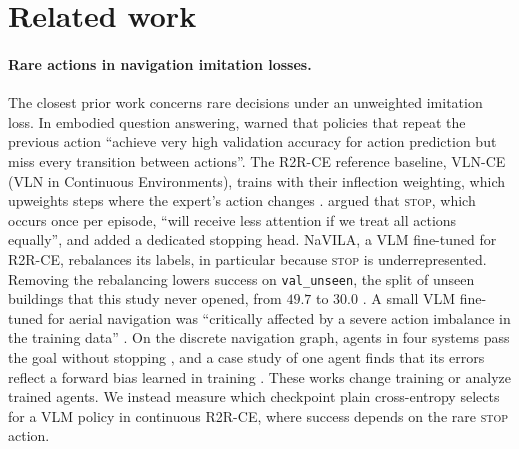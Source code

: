 \section{Related work}
\label{sec:related}

\paragraph{Rare actions in navigation imitation losses.} The closest prior work concerns rare
decisions under an unweighted imitation loss. In embodied question answering,
\citet{wijmans2019eqa} warned that policies that repeat the previous action ``achieve very
high validation accuracy for action prediction but miss every transition between actions''. The
R2R-CE reference baseline, VLN-CE (VLN in Continuous Environments), trains with their inflection weighting, which upweights steps where the
expert's action changes \citep{krantz2020beyond}. \citet{xiang2020l2stop} argued that
\textsc{stop}, which occurs once per episode, ``will receive less attention if we treat all actions
equally'', and added a dedicated stopping head. NaVILA, a VLM fine-tuned for R2R-CE, rebalances its
labels, in particular because \textsc{stop} is underrepresented. Removing the rebalancing lowers success on
\texttt{val\_unseen}, the split of unseen buildings that this study never opened, from $49.7$ to
$30.0$ \citep{cheng2025navila}. A small VLM fine-tuned for aerial navigation was ``critically
affected by a severe action imbalance in the training data'' \citep{tamazyan2025aerial}. On the
discrete navigation graph, agents in four systems pass the goal without stopping
\citep{zhao2023mindthegap}, and a case study of one agent finds that its errors reflect a forward
bias learned in training \citep{yang2023behavioral}. These works change training or analyze trained
agents. We instead measure which checkpoint plain cross-entropy selects for a VLM policy in continuous
R2R-CE, where success depends on the rare \textsc{stop} action.

